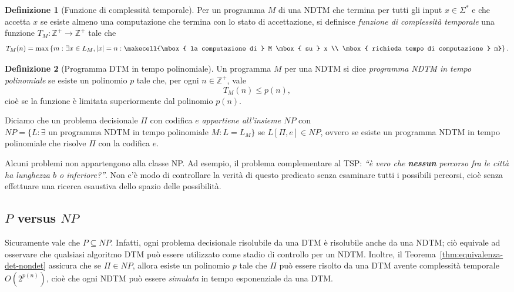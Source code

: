 \documentclass[10pt]{\classname}
\theoremstyle{newlinethm}
\theoremstyle{theorem}
\theoremstyle{definition}
\newtheorem{definizione}{Definizione}[section]
\theoremstyle{definition}
\theoremstyle{definition}
\theoremstyle{definition}
\begin{document}
\begin{definizione}[Funzione di complessità temporale]
    Per un programma $M$ di una NDTM che termina per tutti gli input $x \in \Sigma^*$ e che accetta $x$ se esiste almeno una computazione che termina con lo stato di accettazione, si definisce \emph{funzione di complessità temporale} una funzione $T_M : \mathbb Z^+ \rightarrow \mathbb Z^+$ tale che \[T_M(n) = \max \left\{m : \exists x \in L_M, |x| = n :\makecell{\mbox{ la computazione di } M \mbox{ su } x \\ \mbox{ richieda tempo di computazione } m}\right\}.\]
\end{definizione}

\begin{definizione}[Programma DTM in tempo polinomiale]
    Un programma $M$ per una NDTM si dice \emph{programma NDTM in tempo polinomiale} se esiste un polinomio $p$ tale che, per ogni $n \in \mathbb Z^+$, vale \[T_M(n) \leq p(n),\] cioè se la funzione è limitata superiormente dal polinomio $p(n)$.

    Diciamo che un problema decisionale $\Pi$ con codifica $e$ \emph{appartiene all'insieme $NP$} con $NP = \{L : \exists \mbox{ un programma NDTM in tempo polinomiale } M : L=L_M\}$ se $L[\Pi, e] \in NP$, ovvero se esiste un programma NDTM in tempo polinomiale che risolve $\Pi$ con la codifica $e$.
\end{definizione}

Alcuni problemi non appartengono alla classe NP. Ad esempio, il problema complementare al TSP: \emph{``è vero che \textbf{nessun} percorso fra le città ha lunghezza $b$ o inferiore?''}. Non c'è modo di controllare la verità di questo predicato senza esaminare tutti i possibili percorsi, cioè senza effettuare una ricerca esaustiva dello spazio delle possibilità.

\subsection{$P$ versus $NP$}

Sicuramente vale che $P \subseteq NP$. Infatti, ogni problema decisionale risolubile da una DTM è risolubile anche da una NDTM; ciò equivale ad osservare che qualsiasi algoritmo DTM può essere utilizzato come stadio di controllo per un NDTM. Inoltre, il Teorema~\ref{thm:equivalenza-det-nondet} assicura che se $\Pi \in NP$, allora esiste un polinomio $p$ tale che $\Pi$ può essere risolto da una DTM avente complessità temporale $O(2^{p(n)})$, cioè che ogni NDTM può essere \emph{simulata} in tempo esponenziale da una DTM.
\end{document}

